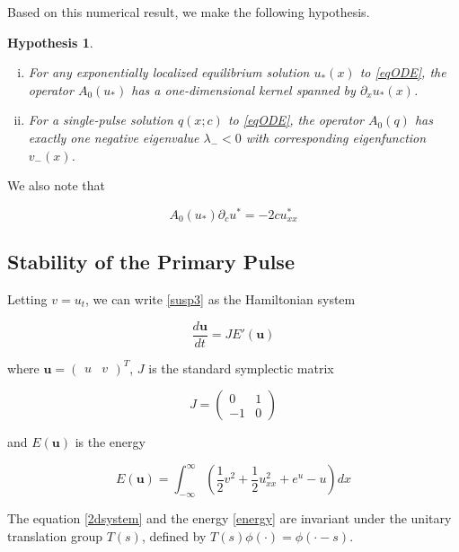 \documentclass[12pt]{article}
\newtheorem{hypothesis}{Hypothesis}
\begin{document}
Based on this numerical result, we make the following hypothesis.

\begin{hypothesis}\label{A0neg}
\begin{enumerate}[(i)]
\mbox{}
\item For any exponentially localized equilibrium solution $u_*(x)$ to \eqref{eqODE}, the operator $A_0(u_*)$ has a one-dimensional kernel spanned by $\partial_x u_*(x)$. 
\item For a single-pulse solution $q(x; c)$ to \eqref{eqODE}, the operator $A_0(q)$ has exactly one negative eigenvalue $\lambda_- < 0$ with corresponding eigenfunction $v_-(x)$.
\end{enumerate}
\end{hypothesis}

We also note that 

\begin{equation}\label{uc}
A_0(u_*) \partial_c u^* = -2 c u^*_{xx}
\end{equation}

\subsection{Stability of the Primary Pulse}

Letting $v = u_t$, we can write \eqref{susp3} as the Hamiltonian system

\begin{equation}\label{2dsystem}
\frac{d \textbf{u} }{dt} = J E'(\textbf{u})
\end{equation}

where $\textbf{u} = \begin{pmatrix}u&v\end{pmatrix}^T$, $J$ is the standard symplectic matrix

\begin{equation*}
J = \begin{pmatrix}0 & 1 \\ -1 & 0 \end{pmatrix}
\end{equation*}

and $E(\textbf{u})$ is the energy

\begin{equation}\label{energy}
E(\textbf{u}) = \int_{-\infty}^\infty \left(\frac{1}{2} v^2 + \frac{1}{2}u_{xx}^2 + e^{u} - u \right)dx
\end{equation}

The equation \eqref{2dsystem} and the energy \eqref{energy} are invariant under the unitary translation group $T(s)$, defined by $T(s)\phi(\cdot) = \phi(\cdot - s)$. \\
\end{document}
